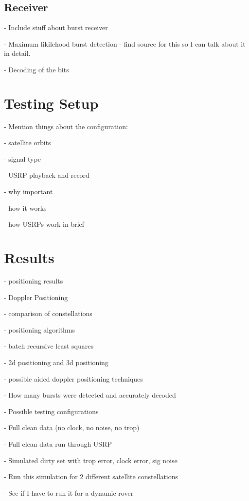 \documentclass[12pt]{report}
\begin{document}
\section{Receiver}
- Include stuff about burst receiver

- Maximum likilehood burst detection
    - find source for this so I can talk about it in detail.

- Decoding of the bits
 
\chapter{Testing Setup}
    - Mention things about the configuration:

    - satellite orbits

    - signal type

    - USRP playback and record

    - why important

    - how it works

    - how USRPs work in brief

\chapter{Results}

    - positioning results

    - Doppler Positioning 

    - comparison of constellations 

    - positioning algorithms

    - batch recursive least squares

    - 2d positioning and 3d positioning

    - possible aided doppler positioning techniques

    - How many bursts were detected and accurately decoded

    - Possible testing configurations   
        
        - Full clean data (no clock, no noise, no trop)

        - Full clean data run through USRP 

        - Simulated dirty set with trop error, clock error, sig noise

        - Run this simulation for 2 different satellite constellations

        - See if I have to run it for a dynamic rover
\end{document}
